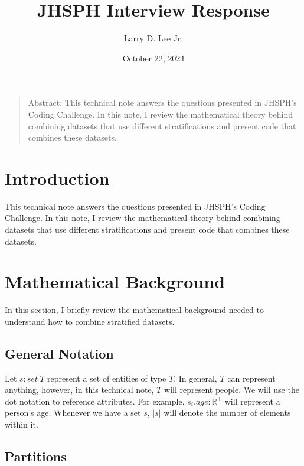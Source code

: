 \documentclass[]{article}
\title{JHSPH Interview Response}
\date{October 22, 2024}
\author{Larry D. Lee Jr.}
\begin{document}
\maketitle


\begin{quote}
Abstract: This technical note answers the questions presented in JHSPH's
Coding Challenge. In this note, I review the mathematical theory behind
combining datasets that use different stratifications and present code
that combines these datasets.
\end{quote}

\hypertarget{introduction}{%
\section{Introduction}\label{introduction}}

This technical note answers the questions presented in JHSPH's Coding
Challenge. In this note, I review the mathematical theory behind
combining datasets that use different stratifications and present code
that combines these datasets.

\hypertarget{mathematical-background}{%
\section{Mathematical Background}\label{mathematical-background}}

In this section, I briefly review the mathematical background needed to
understand how to combine stratified datasets.

\hypertarget{general-notation}{%
\subsection{General Notation}\label{general-notation}}

Let \(s : set\ T\) represent a set of entities of type \(T\). In
general, \(T\) can represent anything, however, in this technical note,
\(T\) will represent people. We will use the dot notation to reference
attributes. For example, \(s_i.age : \mathbb{R^+}\) will represent a
person's age. Whenever we have a set \(s\), \(|s|\) will denote the
number of elements within it.

\hypertarget{partitions}{%
\subsection{Partitions}\label{partitions}}
\end{document}
